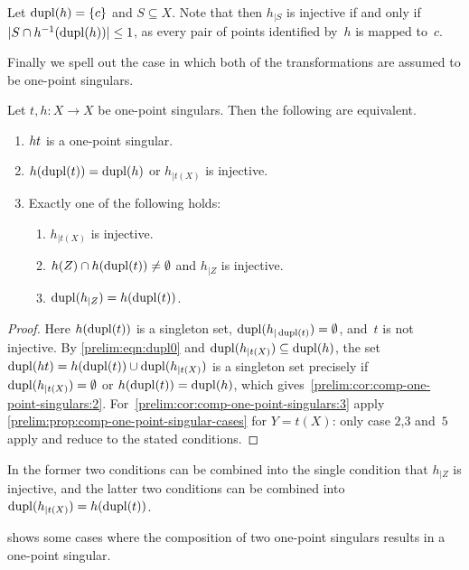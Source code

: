 \begin{remark}
	Let $\dupl{h} = \{c\}$ and $S \subseteq X$. Note that then
	$h_{|S}$ is injective if and only if $|S \cap h^{-1}(\dupl{h})| \le 1$,
	as every pair of points identified by~$h$ is mapped to~$c$.
\end{remark}

Finally we spell out the case in which both of the transformations are assumed
to be one-point singulars.

\begin{corollary} \label{prelim:cor:comp-one-point-singulars}
	Let $t,h \colon X \to X$ be one-point singulars.
	Then the following are equivalent.
	\begin{enumerate}
		\item \label{prelim:cor:comp-one-point-singulars:1}
		$\concat{t}{h}$ is a one-point singular.
		
		\item \label{prelim:cor:comp-one-point-singulars:2}
		$h(\dupl{t}) = \dupl{h}$ or $h_{|t(X)}$ is injective.
		
		\item \label{prelim:cor:comp-one-point-singulars:3}
		Exactly one of the following holds:
		\begin{enumerate}
			\item \label{prelim:cor:comp-one-point-singulars:3a}
			$h_{|t(X)}$ is injective.
			
			\item \label{prelim:cor:comp-one-point-singulars:3b}
			$h(Z) \cap h(\dupl{t}) \ne \emptyset$ and $h_{|Z}$ is injective.
			
			\item \label{prelim:cor:comp-one-point-singulars:3c}
			$\dupl{h_{|Z}} = h(\dupl{t})$.
		\end{enumerate}
	\end{enumerate}
\end{corollary}
\begin{proof}
	Here $h(\dupl{t})$ is a singleton set, $\dupl{h_{|\dupl{t}}} = \emptyset$,
	and~$t$ is not injective.
	By \cref{prelim:eqn:dupl0} and $\dupl{h_{|t(X)}} \subseteq \dupl{h}$, the set
	$\dupl{\concat{t}{h}} = h(\dupl{t}) \cup \dupl{h_{|t(X)}}$ is a singleton set
	precisely if $\dupl{h_{|t(X)}} = \emptyset$ or $h(\dupl{t}) = \dupl{h}$,
	which gives~\ref{prelim:cor:comp-one-point-singulars:2}.
	For~\ref{prelim:cor:comp-one-point-singulars:3} apply
	\cref{prelim:prop:comp-one-point-singular-cases} for $Y = t(X)$:
	only case $2$,$3$ and~$5$ apply and reduce to the stated conditions.
\end{proof}

In 
the former two conditions can be combined into
the single condition that $h_{|Z}$ is injective,
and the latter two conditions can be combined
into $\dupl{h_{|t(X)}} = h(\dupl{t})$.

 shows some cases
where the composition of two one-point singulars results in a one-point singular.